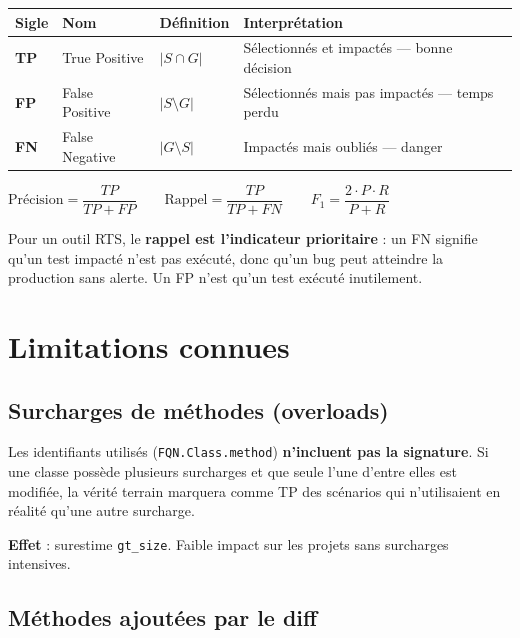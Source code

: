 \documentclass[11pt,a4paper]{article}
\begin{document}
\begin{center}
\begin{tabularx}{\textwidth}{|l|l|l|X|}
\hline
\rowcolor{thbg}
\textbf{Sigle} & \textbf{Nom} & \textbf{Définition} & \textbf{Interprétation} \\
\hline
\textbf{TP} & True Positive  & $|S \cap G|$         & Sélectionnés et impactés --- bonne décision \\
\hline
\textbf{FP} & False Positive & $|S \setminus G|$    & Sélectionnés mais pas impactés --- temps perdu \\
\hline
\textbf{FN} & False Negative & $|G \setminus S|$    & Impactés mais oubliés --- \textcolor{warn}{danger} \\
\hline
\end{tabularx}
\end{center}

\begin{formulabox}
$\text{Précision} = \dfrac{TP}{TP + FP} \qquad
 \text{Rappel} = \dfrac{TP}{TP + FN} \qquad
 F_1 = \dfrac{2 \cdot P \cdot R}{P + R}$
\end{formulabox}

Pour un outil RTS, le \textbf{rappel est l'indicateur prioritaire} : un FN signifie qu'un test impacté n'est pas exécuté, donc qu'un bug peut atteindre la production sans alerte. Un FP n'est qu'un test exécuté inutilement.


\section{Limitations connues}
\label{sec:limites}

\subsection{Surcharges de méthodes (overloads)}

Les identifiants utilisés (\texttt{FQN.Class.method}) \textbf{n'incluent pas la signature}. Si une classe possède plusieurs surcharges et que seule l'une d'entre elles est modifiée, la vérité terrain marquera comme TP des scénarios qui n'utilisaient en réalité qu'une autre surcharge.

\textbf{Effet} : surestime \texttt{gt\_size}. Faible impact sur les projets sans surcharges intensives.

\subsection{Méthodes ajoutées par le diff}
\end{document}
